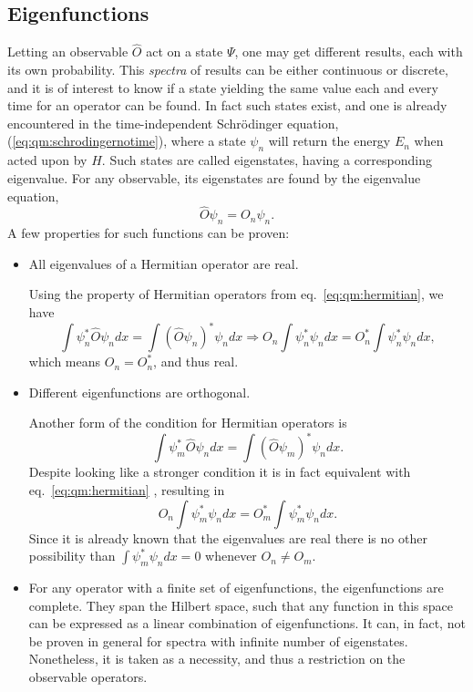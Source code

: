 \subsection{Eigenfunctions}
Letting an observable $\hat{O}$ act on a state $\Psi$, one may get different
results, each with its own probability.
This \textit{spectra} of results can be either continuous or discrete, and it is of interest to know if a state yielding the same value each and every time for an operator can be found.
In fact such states exist, and one is already encountered in the time-independent Schrödinger equation, (\ref{eq:qm:schrodingernotime}), where a state $\psi_n$ will return the energy $E_n$ when acted upon by $\hat{H}$.
Such states are called eigenstates, having a corresponding eigenvalue.
For any observable, its eigenstates are found by the eigenvalue equation,
\begin{equation}
\label{eq:qm:eigenvalue}
\hat{O} \psi_n = O_n \psi_n .
\end{equation}
A few properties for such functions can be proven:
\begin{itemize}
\item All eigenvalues of a Hermitian operator are real.

Using the property of Hermitian operators from eq.~\eqref{eq:qm:hermitian}, we have
\begin{equation}
\int \psi_n^{*} \hat{O} \psi_n dx 
= \int \left(\hat{O} \psi_n\right)^{*} \psi_n dx 
\Rightarrow
O_n \int \psi_n^{*} \psi_n dx 
= O_n^{*} \int \psi_n^{*} \psi_n dx ,
\end{equation}
which means $O_n = O_n^{*}$, and thus real.

\item Different eigenfunctions are orthogonal.

Another form of the condition for Hermitian operators is
\begin{equation}
\int \psi_m^{*} \hat{O} \psi_n dx 
= \int \left(\hat{O} \psi_m\right)^{*} \psi_n dx .
\end{equation}
Despite looking like a stronger condition it is in fact equivalent with eq.~\eqref{eq:qm:hermitian} \cite{griffiths}, resulting in 
\begin{equation}
O_n \int \psi_m^{*} \psi_n dx 
= O_m^{*} \int \psi_m^{*} \psi_n dx .
\end{equation}
Since it is already known that the eigenvalues are real there is no other
possibility than $\int \psi_m^{*} \psi_n dx = 0$ whenever $O_n \neq O_m$.

\item For any operator with a finite set of eigenfunctions, the eigenfunctions
are complete. They span the Hilbert space, such that any function in this space
can be expressed as a linear combination of eigenfunctions.
It can, in fact, not be proven in general for spectra with infinite number of eigenstates.
Nonetheless, it is taken as a necessity, and thus a restriction on the observable operators.
\end{itemize}




